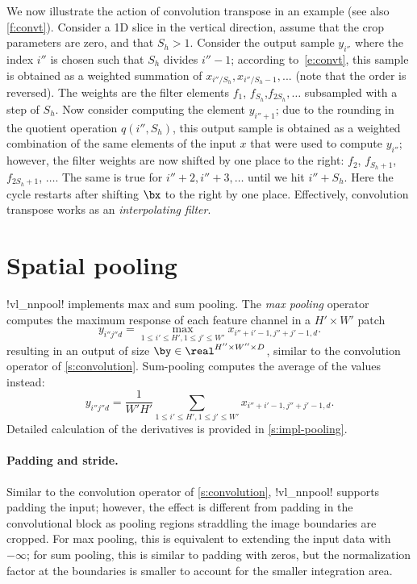 We now illustrate the action of convolution transpose in an example (see also \cref{f:convt}).  Consider a 1D slice in the vertical direction, assume that the crop parameters are zero, and that $S_h>1$. Consider the output sample $y_{i''}$ where the index $i''$ is chosen such that $S_h$ divides $i''-1$; according to~\eqref{e:convt}, this sample is obtained as a weighted summation of $x_{i'' / S_h},x_{i''/S_h-1},...$ (note that the order is reversed). The weights are the filter elements $f_1$, $f_{S_h}$,$f_{2S_h},\dots$ subsampled with a step of $S_h$. Now consider computing the element $y_{i''+1}$; due to the rounding in the quotient operation $q(i'',S_h)$, this output sample is obtained as a weighted combination of the same elements of the input $x$ that were used to compute $y_{i''}$; however, the filter weights are now shifted by one place to the right: $f_2$, $f_{S_h+1}$,$f_{2S_h+1}$, $\dots$. The same is true for $i''+2, i'' + 3,\dots$ until we hit $i'' + S_h$. Here the cycle restarts after shifting $\bx$ to the right by one place. Effectively, convolution transpose works as an \emph{interpolating filter}.

\section{Spatial pooling}\label{s:pooling}

!vl_nnpool! implements max and sum pooling. The \emph{max pooling} operator computes the maximum response of each feature channel in a $H' \times W'$ patch
\[
y_{i''j''d} = \max_{1\leq i' \leq H', 1 \leq j' \leq W'} x_{i''+i'-1,j''+j'-1,d}.
\]
resulting in an output of size $\by\in\real^{H''\times W'' \times D}$, similar to the convolution operator of \cref{s:convolution}. Sum-pooling computes the average of the values instead:
\[
y_{i''j''d} = \frac{1}{W'H'}
\sum_{1\leq i' \leq H', 1 \leq j' \leq W'} x_{i''+i'-1,j''+j'-1,d}.
\]
Detailed calculation of the derivatives is provided in \cref{s:impl-pooling}.

\paragraph{Padding and stride.} Similar to the convolution operator of \cref{s:convolution}, !vl_nnpool! supports padding the input; however, the effect is different from padding in the convolutional block as pooling regions straddling the image boundaries are cropped. For max pooling, this is equivalent to extending the input data with $-\infty$; for sum pooling, this is similar to padding with zeros, but the normalization factor at the boundaries is smaller to account for the smaller integration area.

